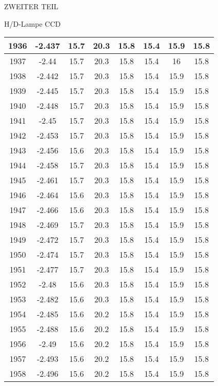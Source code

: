 \begin{appendix}
\begin{chapter}{ZWEITER TEIL}
\begin{section}{H/D-Lampe CCD}
\begin{scriptsize}
\begin{longtable}[htbp]{|c|c|c|c|c|c|c|c|}
            1936 & -2.437 & 15.7 & 20.3 & 15.8 & 15.4 & 15.9 & 15.8 \\ \hline
            1937 & -2.44 & 15.7 & 20.3 & 15.8 & 15.4 & 16 & 15.8 \\ \hline
            1938 & -2.442 & 15.7 & 20.3 & 15.8 & 15.4 & 15.9 & 15.8 \\ \hline
            1939 & -2.445 & 15.7 & 20.3 & 15.8 & 15.4 & 15.9 & 15.8 \\ \hline
            1940 & -2.448 & 15.7 & 20.3 & 15.8 & 15.4 & 15.9 & 15.8 \\ \hline
            1941 & -2.45 & 15.7 & 20.3 & 15.8 & 15.4 & 15.9 & 15.8 \\ \hline
            1942 & -2.453 & 15.7 & 20.3 & 15.8 & 15.4 & 15.9 & 15.8 \\ \hline
            1943 & -2.456 & 15.6 & 20.3 & 15.8 & 15.4 & 15.9 & 15.8 \\ \hline
            1944 & -2.458 & 15.7 & 20.3 & 15.8 & 15.4 & 15.9 & 15.8 \\ \hline
            1945 & -2.461 & 15.7 & 20.3 & 15.8 & 15.4 & 15.9 & 15.8 \\ \hline
            1946 & -2.464 & 15.6 & 20.3 & 15.8 & 15.4 & 15.9 & 15.8 \\ \hline
            1947 & -2.466 & 15.6 & 20.3 & 15.8 & 15.4 & 15.9 & 15.8 \\ \hline
            1948 & -2.469 & 15.7 & 20.3 & 15.8 & 15.4 & 15.9 & 15.8 \\ \hline
            1949 & -2.472 & 15.7 & 20.3 & 15.8 & 15.4 & 15.9 & 15.8 \\ \hline
            1950 & -2.474 & 15.7 & 20.3 & 15.8 & 15.4 & 15.9 & 15.8 \\ \hline
            1951 & -2.477 & 15.7 & 20.3 & 15.8 & 15.4 & 15.9 & 15.8 \\ \hline
            1952 & -2.48 & 15.6 & 20.3 & 15.8 & 15.4 & 15.9 & 15.8 \\ \hline
            1953 & -2.482 & 15.6 & 20.3 & 15.8 & 15.4 & 15.9 & 15.8 \\ \hline
            1954 & -2.485 & 15.6 & 20.2 & 15.8 & 15.4 & 15.9 & 15.8 \\ \hline
            1955 & -2.488 & 15.6 & 20.2 & 15.8 & 15.4 & 15.9 & 15.8 \\ \hline
            1956 & -2.49 & 15.6 & 20.2 & 15.8 & 15.4 & 15.9 & 15.8 \\ \hline
            1957 & -2.493 & 15.6 & 20.2 & 15.8 & 15.4 & 15.9 & 15.8 \\ \hline
            1958 & -2.496 & 15.6 & 20.2 & 15.8 & 15.4 & 15.9 & 15.8 \\ \hline

\end{longtable}
\end{scriptsize}
\end{section}
\end{chapter}
\end{appendix}
